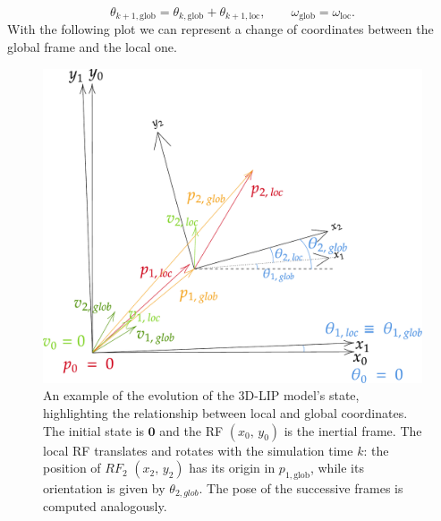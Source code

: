 \begin{equation}
    \theta_{k+1, \text{glob}} = \theta_{k, \text{glob}} + \theta_{k+1, \text{loc}},
    \qquad
    \omega_{\text{glob}} = \omega_{\text{loc}}.
\end{equation}
With the following plot we can represent a change of coordinates between the global frame and the local one.
\begin{figure}[h]
    \centering
    \includegraphics[width=0.75\linewidth]{figures/LIP/loc_to_glob_tfm2.pdf}
    \caption{An example of the evolution of the 3D-LIP model's state, highlighting the relationship between local and global coordinates. The initial state is $\mathbf{0}$ and the RF $(x_0,\, y_0)$ is the inertial frame. The local RF translates and rotates with the simulation time $k$: the position of $RF_2$ $(x_2,\, y_2)$ has its origin in $p_{1, \text{glob}}$, while its orientation is given by $\theta_{2, glob}$. The pose of the successive frames is computed analogously.}
    \label{fig:loc_to_glob_tfm}
\end{figure}

